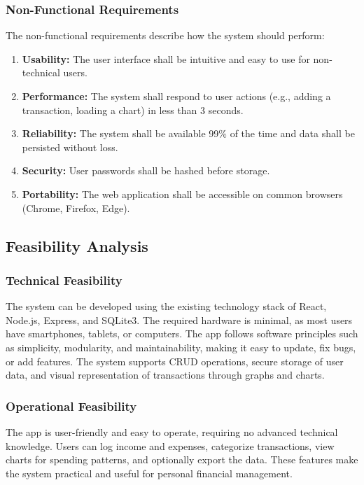 \documentclass[12pt]{report}
\begin{document}
\subsubsection{Non-Functional Requirements}
The non-functional requirements describe how the system should perform:
\begin{enumerate}[label=\roman*., topsep=2pt, partopsep=0pt, itemsep=2pt, parsep=0pt]
    \item \textbf{Usability:} The user interface shall be intuitive and easy to use for non-technical users.
    \item \textbf{Performance:} The system shall respond to user actions (e.g., adding a transaction, loading a chart) in less than 3 seconds.
    \item \textbf{Reliability:} The system shall be available 99\% of the time and data shall be persisted without loss.
    \item \textbf{Security:} User passwords shall be hashed before storage.
    \item \textbf{Portability:} The web application shall be accessible on common browsers (Chrome, Firefox, Edge).
\end{enumerate}

\subsection{Feasibility Analysis}

\subsubsection{Technical Feasibility}
The system can be developed using the existing technology stack of React, Node.js, Express, and SQLite3. The required hardware is minimal, as most users have smartphones, tablets, or computers. The app follows software principles such as simplicity, modularity, and maintainability, making it easy to update, fix bugs, or add features. The system supports CRUD operations, secure storage of user data, and visual representation of transactions through graphs and charts.

\subsubsection{Operational Feasibility}
The app is user-friendly and easy to operate, requiring no advanced technical knowledge. Users can log income and expenses, categorize transactions, view charts for spending patterns, and optionally export the data. These features make the system practical and useful for personal financial management.
\end{document}
